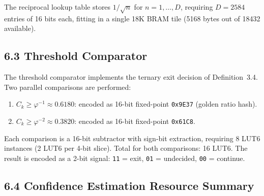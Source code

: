 The reciprocal lookup table stores
\(1/\sqrt{n}\) for \(n = 1, \ldots, D\), requiring
\(D = 2584\) entries of 16 bits each, fitting in a
single 18K BRAM tile (5168 bytes out of 18432
available).

\subsection{6.3 Threshold Comparator}

The threshold comparator implements the ternary exit
decision of Definition~3.4. Two parallel comparisons
are performed:

\begin{enumerate}
\tightlist
\item \(C_k \ge \varphi^{-1} \approx 0.6180\):
      encoded as 16-bit fixed-point
      \texttt{0x9E37} (golden ratio hash).
\item \(C_k \ge \varphi^{-2} \approx 0.3820\):
      encoded as 16-bit fixed-point \texttt{0x61C8}.
\end{enumerate}

Each comparison is a 16-bit subtractor with sign-bit
extraction, requiring 8 LUT6 instances (2 LUT6 per
4-bit slice). Total for both comparisons: 16 LUT6.
The result is encoded as a 2-bit signal:
\texttt{11} = exit, \texttt{01} = undecided,
\texttt{00} = continue.

\subsection{6.4 Confidence Estimation Resource Summary}

